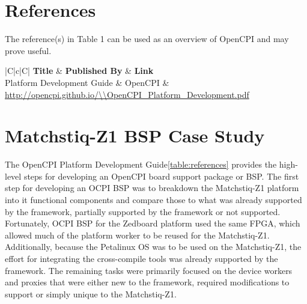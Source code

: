 \newpage
\tableofcontents

\newpage
\section{References}

The reference(s) in Table 1 can be used as an overview of OpenCPI and may prove useful.

\begin{center}
  \begin{table}[H]
  \begin{tabularx}{\textwidth}{|C|c|C|}
    \hline
    \textbf{Title} & \textbf{Published By} & \textbf{Link} \\
    \hline
	Platform Development Guide & OpenCPI & \url{http://opencpi.github.io/\\OpenCPI\_Platform\_Development.pdf}\\
    \hline
  \end{tabularx}
  \caption {References}
  \label{table:references}
  \end{table}
\end{center}

\newpage
\section{Matchstiq-Z1 BSP Case Study}
The OpenCPI Platform Development Guide\ref{table:references} provides the high-level steps for developing an OpenCPI board support package or BSP. The first step for developing an OCPI BSP was to breakdown the Matchstiq-Z1 platform into it functional components and compare those to what was already supported by the framework, partially supported by the framework or not supported. Fortunately, OCPI BSP for the Zedboard platform used the same FPGA, which allowed much of the platform worker to be reused for the Matchstiq-Z1. Additionally, because the Petalinux OS was to be used on the Matchstiq-Z1, the effort for integrating the cross-compile tools was already supported by the framework. The remaining tasks were primarily focused on the device workers and proxies that were either new to the framework, required modifications to support or simply unique to the Matchstiq-Z1.\\ \par\medskip

